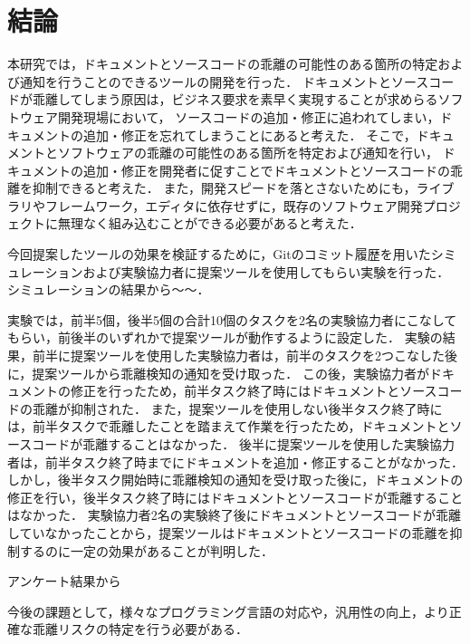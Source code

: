 \chapter{結論}
本研究では，ドキュメントとソースコードの乖離の可能性のある箇所の特定および通知を行うことのできるツールの開発を行った．
ドキュメントとソースコードが乖離してしまう原因は，ビジネス要求を素早く実現することが求めらるソフトウェア開発現場において，
ソースコードの追加・修正に追われてしまい，ドキュメントの追加・修正を忘れてしまうことにあると考えた．
そこで，ドキュメントとソフトウェアの乖離の可能性のある箇所を特定および通知を行い，
ドキュメントの追加・修正を開発者に促すことでドキュメントとソースコードの乖離を抑制できると考えた．
また，開発スピードを落とさないためにも，ライブラリやフレームワーク，エディタに依存せずに，既存のソフトウェア開発プロジェクトに無理なく組み込むことができる必要があると考えた．

今回提案したツールの効果を検証するために，Gitのコミット履歴を用いたシミュレーションおよび実験協力者に提案ツールを使用してもらい実験を行った．
シミュレーションの結果から〜〜．

実験では，前半5個，後半5個の合計10個のタスクを2名の実験協力者にこなしてもらい，前後半のいずれかで提案ツールが動作するように設定した．
実験の結果，前半に提案ツールを使用した実験協力者は，前半のタスクを2つこなした後に，提案ツールから乖離検知の通知を受け取った．
この後，実験協力者がドキュメントの修正を行ったため，前半タスク終了時にはドキュメントとソースコードの乖離が抑制された．
また，提案ツールを使用しない後半タスク終了時には，前半タスクで乖離したことを踏まえて作業を行ったため，ドキュメントとソースコードが乖離することはなかった．
後半に提案ツールを使用した実験協力者は，前半タスク終了時までにドキュメントを追加・修正することがなかった．
しかし，後半タスク開始時に乖離検知の通知を受け取った後に，ドキュメントの修正を行い，後半タスク終了時にはドキュメントとソースコードが乖離することはなかった．
実験協力者2名の実験終了後にドキュメントとソースコードが乖離していなかったことから，提案ツールはドキュメントとソースコードの乖離を抑制するのに一定の効果があることが判明した．

アンケート結果から

今後の課題として，様々なプログラミング言語の対応や，汎用性の向上，より正確な乖離リスクの特定を行う必要がある．